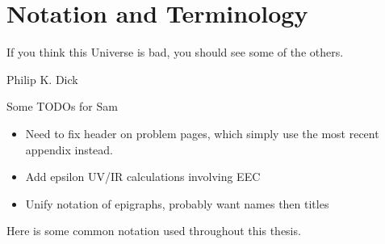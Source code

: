 \section*{Notation and Terminology}


\epigraph{If you think this Universe is bad, you should see some of the others.}{Philip K. Dick}


\begin{sambox}{Some TODOs for Sam}{}
    \begin{itemize}
        \item
            Need to fix header on problem pages, which simply use the most recent appendix instead.

        \item
            Add epsilon UV/IR calculations involving EEC

        \item
            Unify notation of epigraphs, probably want names then titles
    \end{itemize}
\end{sambox}

Here is some common notation used throughout this thesis.

